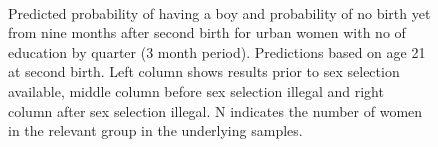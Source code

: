 \documentclass[12pt,letterpaper]{article}
\begin{document}
\begin{figure}[htpb]
{\begin{minipage}{0.26\textwidth}
        \\
        \captionsetup[subfigure]{labelformat=parens}
    \end{minipage}
}
\setcounter{subfigure}{3}
\caption{Predicted probability of having a boy and probability of
no birth yet from nine months after second birth for urban 
women with no of education by quarter (3 month period). 
Predictions based on age 21 at second birth.
Left column shows results prior to sex selection available, middle column before
sex selection illegal and right column after sex selection illegal.
N indicates the number of women in the relevant group in the underlying samples.
}
\label{fig:results_spell3_low_urban}
\end{figure}
\end{document}
